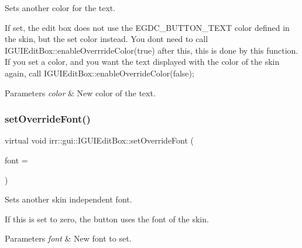 Sets another color for the text. 

If set, the edit box does not use the E\+G\+D\+C\+\_\+\+B\+U\+T\+T\+O\+N\+\_\+\+T\+E\+XT color defined in the skin, but the set color instead. You don\textquotesingle{}t need to call I\+G\+U\+I\+Edit\+Box\+::enable\+Overrride\+Color(true) after this, this is done by this function. If you set a color, and you want the text displayed with the color of the skin again, call I\+G\+U\+I\+Edit\+Box\+::enable\+Override\+Color(false); 
\begin{DoxyParams}{Parameters}
{\em color} & New color of the text. \\
\hline
\end{DoxyParams}
\mbox{\label{classirr_1_1gui_1_1IGUIEditBox_a7608fe327ec860712ec87b5e1dc4aec9}} 
\subsubsection{\texorpdfstring{set\+Override\+Font()}{setOverrideFont()}}
{\footnotesize\ttfamily virtual void irr\+::gui\+::\+I\+G\+U\+I\+Edit\+Box\+::set\+Override\+Font (\begin{DoxyParamCaption}\item[{\hyperlink{classirr_1_1gui_1_1IGUIFont}{I\+G\+U\+I\+Font} $\ast$}]{font = {} }\end{DoxyParamCaption})\hspace{0.3cm}{\ttfamily [pure virtual]}}



Sets another skin independent font. 

If this is set to zero, the button uses the font of the skin. 
\begin{DoxyParams}{Parameters}
{\em font} & New font to set. \\
\hline
\end{DoxyParams}
\mbox{\label{classirr_1_1gui_1_1IGUIEditBox_a755baeca9941267fe11b0c0598b772bf}} 
